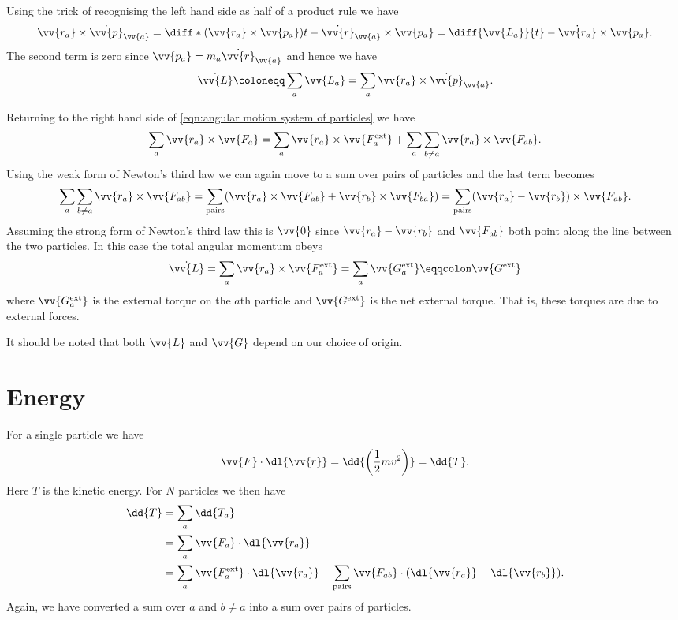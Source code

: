 \documentclass[fleqn]{NotesClass}
\newcommand*{\ext}{\mathrm{ext}}
\begin{document}
    Using the trick of recognising the left hand side as half of a product rule we have
    \begin{equation}
        \vv{r_a}\times\dot{\vv{p}}_{\vv{a}} = \diff*{(\vv{r_a}\times\vv{p_a})}{t} - \dot{\vv{r}}_{\vv{a}}\times\vv{p_a} = \diff{\vv{L_a}}{t} - \dot{\vv{r_a}} \times \vv{p_a}.
    \end{equation}
    The second term is zero since \(\vv{p_a} = m_a\dot{\vv{r}}_{\vv{a}}\) and hence we have
    \begin{equation}
        \dot{\vv{L}} \coloneqq \sum_a \vv{L_a} = \sum_a \vv{r_a}\times\dot{\vv{p}}_{\vv{a}}.
    \end{equation}
    
    Returning to the right hand side of \cref{eqn:angular motion system of particles} we have
    \begin{equation}
        \sum_a \vv{r_a}\times\vv{F_a} = \sum_a \vv{r_a} \times \vv{F_a^{\ext}} + \sum_{a}\sum_{b\ne a}\vv{r_a}\times\vv{F_{ab}}.
    \end{equation}
    Using the weak form of Newton's third law we can again move to a sum over pairs of particles and the last term becomes
    \begin{equation}
        \sum_{a}\sum_{b\ne a} \vv{r_a}\times \vv{F_{ab}} = \sum_{\text{pairs}} (\vv{r_a}\times \vv{F_{ab}} + \vv{r_b}\times\vv{F_{ba}}) = \sum_{\text{pairs}} (\vv{r_a} - \vv{r_b})\times\vv{F_{ab}}.
    \end{equation}
    Assuming the strong form of Newton's third law this is \(\vv{0}\) since \(\vv{r_a} - \vv{r_b}\) and \(\vv{F_{ab}}\) both point along the line between the two particles.
    In this case the total angular momentum obeys
    \begin{equation}
        \dot{\vv{L}} = \sum_a \vv{r_a}\times\vv{F_a^{\ext}} = \sum_a \vv{G_a^{\ext}} \eqqcolon \vv{G^{\ext}}
    \end{equation}
    where \(\vv{G_a^{\ext}}\) is the external torque on the \(a\)th particle and \(\vv{G^{\ext}}\) is the net external torque.
    That is, these torques are due to external forces.
    
    It should be noted that both \(\vv{L}\) and \(\vv{G}\) depend on our choice of origin.
    
    \section{Energy}
    For a single particle we have
    \begin{equation}
        \vv{F}\cdot\dl{\vv{r}} = \dd{\left( \frac{1}{2}mv^2 \right)} = \dd{T}.
    \end{equation}
    Here \(T\) is the kinetic energy.
    For \(N\) particles we then have
    \begin{align}
        \dd{T} &= \sum_a \dd{T_a}\\
        &= \sum_a \vv{F_a}\cdot\dl{\vv{r_a}}\\
        &= \sum_a \vv{F_a^{\ext}}\cdot\dl{\vv{r_a}} + \sum_{\text{pairs}} \vv{F_{ab}}\cdot(\dl{\vv{r_a}} - \dl{\vv{r_b}}).
    \end{align}
    Again, we have converted a sum over \(a\) and \(b \ne a\) into a sum over pairs of particles.
    
\end{document}
